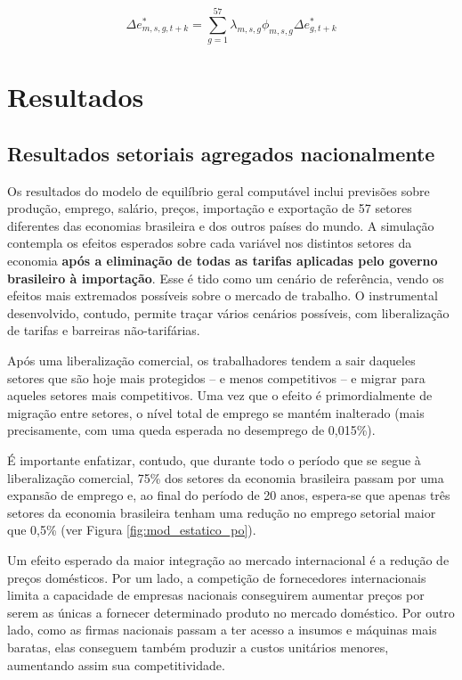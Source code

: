 \documentclass{article}
\begin{document}
\begin{equation}
    \label{eq:micro_agg}
    \Delta e_{m,s,g,t+k}^* = \sum_{g=1}^{57} \lambda_{m,s,g} \phi_{m,s,g} \Delta e_{g,t+k}^*
\end{equation}

\section{Resultados} 

\subsection{Resultados setoriais agregados nacionalmente} 

Os resultados do modelo de equilíbrio geral computável inclui previsões sobre produção, emprego, salário, preços, importação e exportação de 57 setores diferentes das economias brasileira e dos outros países do mundo. A simulação contempla os efeitos esperados sobre cada variável nos distintos setores da economia \textbf{após a eliminação de todas as tarifas aplicadas pelo governo brasileiro à importação}. Esse é tido como um cenário de referência, vendo os efeitos mais extremados possíveis sobre o mercado de trabalho. O instrumental desenvolvido, contudo, permite traçar vários cenários possíveis, com liberalização de tarifas e barreiras não-tarifárias.

Após uma liberalização comercial, os trabalhadores tendem a sair daqueles setores que são hoje mais protegidos – e menos competitivos – e migrar para aqueles setores mais competitivos. Uma vez que o efeito é primordialmente de migração entre setores, o nível total de emprego se mantém inalterado (mais precisamente, com uma queda esperada no desemprego de 0,015\%).

É importante enfatizar, contudo, que durante todo o período que se segue à liberalização comercial, 75\% dos setores da economia brasileira passam por uma expansão de emprego e, ao final do período de 20 anos, espera-se que apenas três setores da economia brasileira tenham uma redução no emprego setorial maior que 0,5\% (ver Figura \ref{fig:mod_estatico_po}).

Um efeito esperado da maior integração ao mercado internacional é a redução de preços domésticos. Por um lado, a competição de fornecedores internacionais limita a capacidade de empresas nacionais conseguirem aumentar preços por serem as únicas a fornecer determinado produto no mercado doméstico. Por outro lado, como as firmas nacionais passam a ter acesso a insumos e máquinas mais baratas, elas conseguem também produzir a custos unitários menores, aumentando assim sua competitividade.
\end{document}
